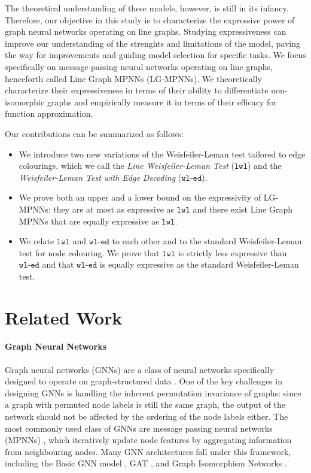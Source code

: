 \documentclass{article}
\newcommand{\wledge}{\texttt{wl-ed}}
\newcommand{\lwl}{\texttt{lwl}}
\begin{document}
The theoretical understanding of these models, however, is still in its infancy.
Therefore, our objective in this study is to characterize the expressive power of graph neural networks operating on line graphs. Studying expressiveness can improve our understanding of the strenghts and limitations of the model, paving the way for improvements and guiding model selection for specific tasks. We focus specifically on message-passing neural networks operating on line graphs, henceforth called Line Graph MPNNs (LG-MPNNs). We theoretically characterize their expressiveness in terms of their ability to differentiate non-isomorphic graphs and empirically measure it in terms of their efficacy for function approximation.

Our contributions can be summarized as follows:
\begin{itemize}
    \item We introduce two new variations of the Weisfeiler-Leman test tailored to edge colourings, which we call the \emph{Line Weisfeiler-Leman Test} ($\lwl$) and the \emph{Weisfeiler-Leman Test with Edge Decoding} ($\wledge$).
    \item We prove both an upper and a lower bound on the expressivity of LG-MPNNs: they are at most as expressive as $\lwl$ and there exist Line Graph MPNNs that are equally expressive as $\lwl$.
    \item We relate $\lwl$ and $\wledge$ to each other and to the standard Weisfeiler-Leman test for node colouring. We prove that $\lwl$ is strictly less expressive than $\wledge$ and that $\wledge$ is equally expressive as the standard Weisfeiler-Leman test.
\end{itemize}


\section{Related Work}

\paragraph{Graph Neural Networks}
Graph neural networks (GNNs) are a class of neural networks specifically designed to operate on graph-structured data \cite{scarselli2008graph}. One of the key challenges in designing GNNs is handling the inherent permutation invariance of graphs: since a graph with permuted node labels is still the same graph, the output of the network should not be affected by the ordering of the node labels either.
The most commonly used class of GNNs are message passing neural networks (MPNNs) \cite{gilmer2017neural}, which iteratively update node features by aggregating information from neighbouring nodes. Many GNN architectures fall under this framework, including the Basic GNN model \cite{hamilton2020graph}, GAT \cite{velickovic2017graph}, and Graph Isomorphism Networks \cite{xu2018powerful}.
\end{document}
